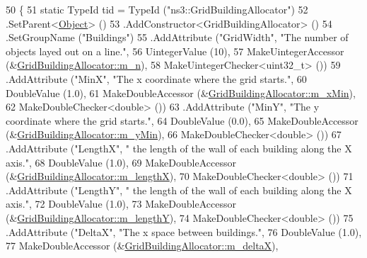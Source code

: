 \begin{DoxyCode}
50 \{
51   \textcolor{keyword}{static} TypeId tid = TypeId (\textcolor{stringliteral}{"ns3::GridBuildingAllocator"})
52     .SetParent<\hyperlink{classns3_1_1Object_a40860402e64d8008fb42329df7097cdb}{Object}> ()
53     .AddConstructor<GridBuildingAllocator> ()
54     .SetGroupName (\textcolor{stringliteral}{"Buildings"})
55     .AddAttribute (\textcolor{stringliteral}{"GridWidth"}, \textcolor{stringliteral}{"The number of objects layed out on a line."},
56                    UintegerValue (10),
57                    MakeUintegerAccessor (&\hyperlink{classns3_1_1GridBuildingAllocator_a8ee51ecb7e29bd6a067dfa69dabb00fc}{GridBuildingAllocator::m\_n}),
58                    MakeUintegerChecker<uint32\_t> ())
59     .AddAttribute (\textcolor{stringliteral}{"MinX"}, \textcolor{stringliteral}{"The x coordinate where the grid starts."},
60                    DoubleValue (1.0),
61                    MakeDoubleAccessor (&\hyperlink{classns3_1_1GridBuildingAllocator_a7bcb4fb2c6e2471ae4a891c0df86e413}{GridBuildingAllocator::m\_xMin}),
62                    MakeDoubleChecker<double> ())
63     .AddAttribute (\textcolor{stringliteral}{"MinY"}, \textcolor{stringliteral}{"The y coordinate where the grid starts."},
64                    DoubleValue (0.0),
65                    MakeDoubleAccessor (&\hyperlink{classns3_1_1GridBuildingAllocator_a35886beb66427093d15cf0c367879f85}{GridBuildingAllocator::m\_yMin}),
66                    MakeDoubleChecker<double> ())
67     .AddAttribute (\textcolor{stringliteral}{"LengthX"}, \textcolor{stringliteral}{" the length of the wall of each building along the X axis."},
68                    DoubleValue (1.0),
69                    MakeDoubleAccessor (&\hyperlink{classns3_1_1GridBuildingAllocator_abdb168a16e59b4a926e32b7e2324b8f0}{GridBuildingAllocator::m\_lengthX}),
70                    MakeDoubleChecker<double> ())
71     .AddAttribute (\textcolor{stringliteral}{"LengthY"}, \textcolor{stringliteral}{" the length of the wall of each building along the X axis."},
72                    DoubleValue (1.0),
73                    MakeDoubleAccessor (&\hyperlink{classns3_1_1GridBuildingAllocator_af0dd03f4a5154a2e1ac8f657d8c70cea}{GridBuildingAllocator::m\_lengthY}),
74                    MakeDoubleChecker<double> ())
75     .AddAttribute (\textcolor{stringliteral}{"DeltaX"}, \textcolor{stringliteral}{"The x space between buildings."},
76                    DoubleValue (1.0),
77                    MakeDoubleAccessor (&\hyperlink{classns3_1_1GridBuildingAllocator_a98646154255d263b3aea73237f89dfd7}{GridBuildingAllocator::m\_deltaX}),

\end{DoxyCode}
